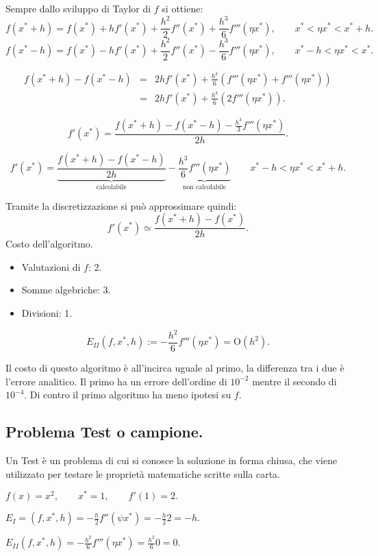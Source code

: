 Sempre dallo sviluppo di Taylor di $f$ si ottiene:
\[
f(x^* + h) = f(x^*) + hf'(x^*) + \frac{h^2}{2}f''(x^*) + 
\frac{h^3}{6}f'''(\eta x^*), \qquad x^* < \eta x^*
< x^* +h. 
\]
\[
f(x^* - h) = f(x^*) - hf'(x^*) + \frac{h^2}{2}f''(x^*) - 
\frac{h^3}{6}f'''(\eta x^*), \qquad x^*- h < \eta x^*
< x^*. 
\]

\[
\begin{array}{lcl}
f(x^* + h) - f(x^* - h) & = & 2hf'(x^*) + \frac{h^3}{6}\left(f'''(\eta x^*) +
f'''(\eta x^*)\right) \\
& = & 2hf'(x^*) + \frac{h^3}{6}\left(2f'''(\eta x^*)\right).
\end{array}
\]

\[
f'(x^*) = \frac{f(x^* + h) - f(x^* - h) -\frac{h^3}{3}f'''(\eta x^*)}{2h}.
\]

\[
f'(x^*) = \underbrace{\frac{f(x^* + h) - f(x^* - h)}{2h}}_{\textrm{calcolabile}} -
\underbrace{\frac{h^3}{6}f'''(\eta x^*)}_{\textrm{non calcolabile}}
\qquad x^*- h < \eta x^* < x^*+h. 
\]

Tramite la discretizzazione si può approssimare quindi:
\[f'(x^*) \simeq \frac{f(x^* + h) - f(x^*)}{2h} .\]
Costo dell'algoritmo.
\begin{itemize}
\item[]Valutazioni di $f$: 2.
\item[]Somme algebriche: 3.
\item[]Divisioni: 1.
\end{itemize}
\[E_{II}(f, x^*, h) := - \frac{h^2}{6}f'''(\eta x^*) = \textrm{O}(h^2).\]

Il costo di questo algoritmo è all'incirca uguale al primo, la differenza
tra i due è l'errore analitico. Il primo ha un errore dell'ordine di $10^{-2}$
mentre il secondo di $10^{-4}$. Di contro il primo algoritmo ha meno ipotesi
su $f$.

\subsection{Problema Test o campione.}
Un Test è un problema di cui si conosce la soluzione in forma chiusa, che
viene utilizzato per testare le proprietà matematiche scritte sulla carta.

\begin{exe}
\begin{flushleft}
$f(x) = x^2, \qquad x^* = 1, \qquad f'(1) = 2.$
\end{flushleft}
\begin{flushleft}
$E_I = (f, x^*, h) = - \frac{h}{2}f''(\psi x^*) = - \frac{h}{2}2 = -h.$
\end{flushleft}
\begin{flushleft}
$E_{II}(f, x^*, h) = - \frac{h^2}{6}f'''(\eta x^*)
= \frac{h^2}{6}0 = 0.$
\end{flushleft}
\end{exe}

